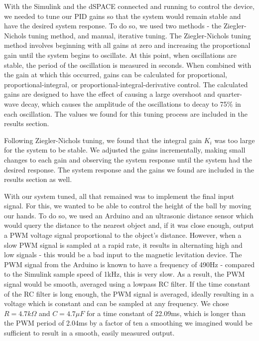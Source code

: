 \documentclass{article}
\begin{document}
With the Simulink and the dSPACE connected and running to control the device, we needed to tune our PID gains so that the system would remain stable and have the desired system response.  To do so, we used two methods - the Ziegler-Nichols tuning method, and manual, iterative tuning.  The Ziegler-Nichols tuning method involves beginning with all gains at zero and increasing the proportional gain until the system begins to oscillate.  At this point, when oscillations are stable, the period of the oscillation is measured in seconds.  When combined with the gain at which this occurred, gains can be calculated for proportional, proportional-integral, or proportional-integral-derivative control.  The calculated gains are designed to have the effect of causing a large overshoot and quarter-wave decay, which causes the amplitude of the oscillations to decay to 75\% in each oscillation.  The values we found for this tuning process are included in the results section.

Following Ziegler-Nichols tuning, we found that the integral gain $K_i$ was too large for the system to be stable.  We adjusted the gains incrementally, making small changes to each gain and observing the system response until the system had the desired response.  The system response and the gains we found are included in the results section as well. 

With our system tuned, all that remained was to implement the final input signal.  For this, we wanted to be able to control the height of the ball by moving our hands.  To do so, we used an Arduino and an ultrasonic distance sensor which would query the distance to the nearest object and, if it was close enough, output a PWM voltage signal proportional to the object's distance.  However, when a slow PWM signal is sampled at a rapid rate, it results in alternating high and low signals - this would be a bad input to the magnetic levitation device.  The PWM signal from the Arduino is known to have a frequency of 490Hz - compared to the Simulink sample speed of 1kHz, this is very slow. As a result, the PWM signal would be smooth, averaged using a lowpass RC filter.  If the time constant of the RC filter is long enough, the PWM signal is averaged, ideally resulting in a voltage which is constant and can be sampled at any frequency. We chose $R = 4.7k\Omega$ and $C = 4.7\mu F$ for a time constant of 22.09ms, which is longer than the PWM period of 2.04ms by a factor of ten a smoothing we imagined would be sufficient to result in a smooth, easily measured output.
\end{document}
